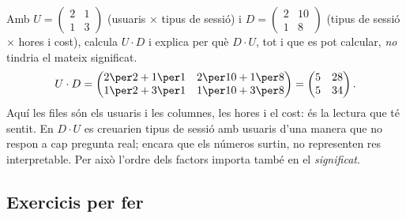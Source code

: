 \begin{exresolt}
Amb $U=\begin{pmatrix} 2 & 1 \\ 1 & 3 \end{pmatrix}$ (usuaris $\times$ tipus de
sessió) i $D=\begin{pmatrix} 2 & 10 \\ 1 & 8 \end{pmatrix}$ (tipus de sessió
$\times$ hores i cost), calcula $U\cdot D$ i explica per què $D\cdot U$, tot i que
es pot calcular, \emph{no} tindria el mateix significat.
\solucio
\[
U\cdot D=\begin{pmatrix} 2\per 2+1\per 1 & 2\per 10+1\per 8 \\ 1\per 2+3\per 1 & 1\per 10+3\per 8 \end{pmatrix}
=\begin{pmatrix} 5 & 28 \\ 5 & 34 \end{pmatrix}.
\]
Aquí les files són els usuaris i les columnes, les hores i el cost: és la lectura
que té sentit. En $D\cdot U$ es creuarien tipus de sessió amb usuaris d'una manera
que no respon a cap pregunta real; encara que els números surtin, no representen
res interpretable. Per això l'ordre dels factors importa també en el \emph{significat}.
\end{exresolt}

\subsection{Exercicis per fer}

